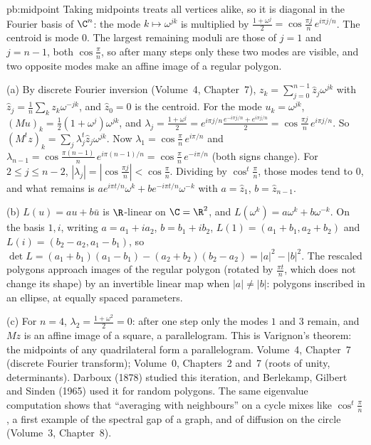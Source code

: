 \begin{solution}{pb:midpoint}
\idea Taking midpoints treats all vertices alike, so it is diagonal in the Fourier basis of $\C^n$: the mode
$k\mapsto\omega^{jk}$ is multiplied by $\frac{1+\omega^j}2=\cos\frac{\pi j}n\,e^{i\pi j/n}$. The centroid is mode $0$. The
largest remaining moduli are those of $j=1$ and $j=n-1$, both $\cos\frac\pi n$, so after many steps only these two modes are
visible, and two opposite modes make an affine image of a regular polygon.

\writeup (a) By discrete Fourier inversion (Volume~4, Chapter~7), $z_k=\sum_{j=0}^{n-1}\hat z_j\omega^{jk}$ with
$\hat z_j=\frac1n\sum_kz_k\omega^{-jk}$, and $\hat z_0=0$ is the centroid. For the mode $u_k=\omega^{jk}$,
$(Mu)_k=\frac12(1+\omega^j)\omega^{jk}$, and
$\lambda_j=\frac{1+\omega^j}2=e^{i\pi j/n}\frac{e^{-i\pi j/n}+e^{i\pi j/n}}2=\cos\frac{\pi j}n\,e^{i\pi j/n}$. So
$(M^tz)_k=\sum_j\lambda_j^t\hat z_j\omega^{jk}$. Now $\lambda_1=\cos\frac\pi n\,e^{i\pi/n}$ and
$\lambda_{n-1}=\cos\frac{\pi(n-1)}n\,e^{i\pi(n-1)/n}=\cos\frac\pi n\,e^{-i\pi/n}$ (both signs change). For $2\le j\le n-2$,
$|\lambda_j|=|\cos\frac{\pi j}n|<\cos\frac\pi n$. Dividing by $\cos^t\frac\pi n$, those modes tend to $0$, and what remains is
$a e^{i\pi t/n}\omega^k+be^{-i\pi t/n}\omega^{-k}$ with $a=\hat z_1$, $b=\hat z_{n-1}$.

(b) $L(u)=au+b\bar u$ is $\R$-linear on $\C=\R^2$, and $L(\omega^k)=a\omega^k+b\omega^{-k}$. On the basis $1,i$, writing
$a=a_1+ia_2$, $b=b_1+ib_2$, $L(1)=(a_1+b_1,a_2+b_2)$ and $L(i)=(b_2-a_2,a_1-b_1)$, so $\det L=(a_1+b_1)(a_1-b_1)-(a_2+b_2)(b_2-a_2)
=|a|^2-|b|^2$. The rescaled polygons approach images of the regular polygon (rotated by $\frac{\pi t}n$, which does not change
its shape) by an invertible linear map when $|a|\ne|b|$: polygons inscribed in an ellipse, at equally spaced parameters.

(c) For $n=4$, $\lambda_2=\frac{1+\omega^2}2=0$: after one step only the modes $1$ and $3$ remain, and $Mz$ is an affine image of
a square, a parallelogram. This is Varignon's theorem: the midpoints of any quadrilateral form a parallelogram.
\tools Volume~4, Chapter~7 (discrete Fourier transform); Volume~0, Chapters~2 and~7 (roots of unity, determinants).
\leads Darboux (1878) studied this iteration, and Berlekamp, Gilbert and Sinden (1965) used it for random polygons. The same
eigenvalue computation shows that ``averaging with neighbours'' on a cycle mixes like $\cos^t\frac\pi n$, a first example of
the spectral gap of a graph, and of diffusion on the circle (Volume~3, Chapter~8).
\end{solution}

